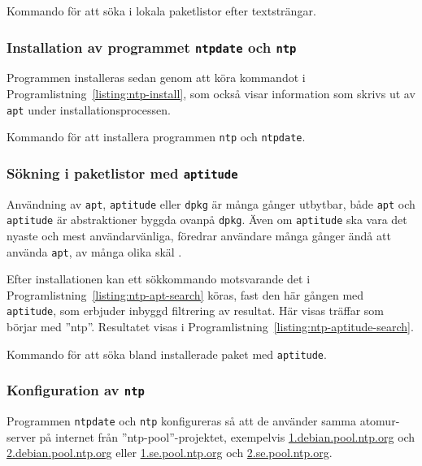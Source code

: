 \begin{listing}[H]
\caption{Kommando för att söka i lokala paketlistor efter textsträngar.}
\label{listing:ntp-apt-search}
\end{listing}


\subsubsection{Installation av programmet \texttt{ntpdate} och \texttt{ntp}}
Programmen installeras sedan genom att köra kommandot i
Programlistning~\ref{listing:ntp-install}, som också visar information som skrivs
ut av \texttt{apt} under installationsprocessen.

\begin{listing}[H]
\caption{Kommando för att installera programmen \texttt{ntp} och \texttt{ntpdate}.}
\label{listing:ntp-install}
\end{listing}


\subsubsection{Sökning i paketlistor med \texttt{aptitude}}
Användning av \texttt{apt}, \texttt{aptitude} eller
\texttt{dpkg} är många gånger utbytbar, både \texttt{apt} och \texttt{aptitude}
är abstraktioner byggda ovanpå \texttt{dpkg}. Även om \texttt{aptitude} ska vara
det nyaste och mest användarvänliga, föredrar användare många gånger ändå
att använda \texttt{apt}, av många olika skäl \cite{superuser:aptitude-apt}.

Efter installationen kan ett sökkommando motsvarande det i
Programlistning~\ref{listing:ntp-apt-search} köras, fast den här gången med
\texttt{aptitude}, som erbjuder inbyggd filtrering av resultat. Här visas
träffar som börjar med ''ntp''. Resultatet visas i
Programlistning~\ref{listing:ntp-aptitude-search}.

\begin{listing}[H]
\caption{Kommando för att söka bland installerade paket med \texttt{aptitude}.}
\label{listing:ntp-aptitude-search}
\end{listing}


\subsubsection{Konfiguration av \texttt{ntp}}
Programmen \texttt{ntpdate} och \texttt{ntp} konfigureras så att de använder
samma atomur-server på internet från ''ntp-pool''-projektet, exempelvis
\url{1.debian.pool.ntp.org} och \url{2.debian.pool.ntp.org} eller
\url{1.se.pool.ntp.org} och \url{2.se.pool.ntp.org}.

